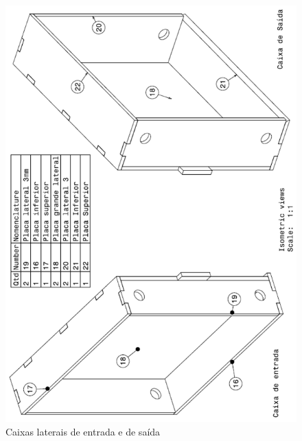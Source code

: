 \begin{anexosenv}
\begin{figure}[!ht]
	\centering
		\includegraphics[scale=0.6]{figuras/estrutura/anexos/6.png}
	\caption{Caixas laterais de entrada e de saída}
\end{figure}


\end{anexosenv}
